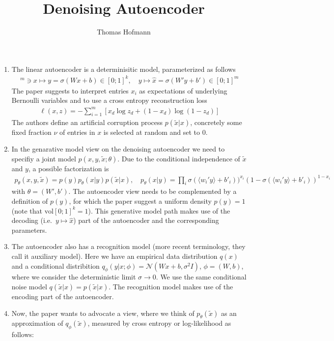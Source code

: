 \documentclass[12pt,a4paper]{article}
\author{Thomas Hofmann}
\title{Denoising Autoencoder}
\begin{document}
\maketitle

\noindent 
\begin{enumerate}
\item 
The linear autoencoder is a determinisitic model, parameterized as follows
\begin{align}
[0;1]^m \ni x \mapsto y = \sigma(Wx + b) \in [0;1]^k, \quad y \mapsto \hat x = \sigma(W'y+ b') \in [0;1]^m
\end{align}
The paper suggests to interpret entries $x_i$ as expectations of underlying Bernoulli variables and to use a cross entropy reconstruction loss
\begin{align}
\ell(x,z) = -\sum_{i=1}^m \left[ x_d \log z_d + (1-x_d) \log (1-z_d) \right]
\end{align}
The authors define an artificial corruption process $p(\tilde x | x)$, concretely some fixed fraction $\nu$ of entries in $x$ is selected at random and set to $0$. 
\item 
In the genarative model view on the denoising autoencoder we need to specifiy a joint model $p(x,y,\tilde x; \theta)$. Due to the conditional independence of $\tilde x$ and $y$, a possible factorization is
\begin{align}
p_\theta(x,y,\tilde x) = p(y) p_\theta(x|y) p(\tilde x|x), \quad p_\theta(x|y) = \prod_i \sigma(\langle w_i'y\rangle+b'_i ))^{x_i}  (1-\sigma(\langle w_i'y\rangle+b'_i ))^{1-x_i}
\end{align}
with $\theta = (W',b')$. The autoencoder view needs to be complemented by a definition of $p(y)$, for which the paper suggest a uniform density $p(y) = 1$ (note that $\text{vol}[0;1]^k = 1$). This generative model path makes use of the decoding (i.e.~$y \mapsto \hat x$) part of the autoencoder and the corresponding parameters.
\item
The autoencoder also has a recognition model (more recent terminology, they call it auxiliary model). Here we have an empirical data distribution $q(x)$ and a conditional distribition $q_\phi(y|x; \phi) = \mathcal N(Wx+b, \sigma^2 I)$, $\phi = (W,b)$, where we consider the deterministic limit $\sigma \to 0$. We use the same conditional noise model $q(\tilde x|x) = p(\tilde x |x)$. The recognition model makes use of the encoding part of the autoencoder.
\item
Now, the paper wants to advocate a view, where we think of $p_\theta(\tilde x)$ as an approximation of $q_\phi(\tilde x)$, measured by cross entropy or log-likelihood as follows:

\end{enumerate}
\end{document}
